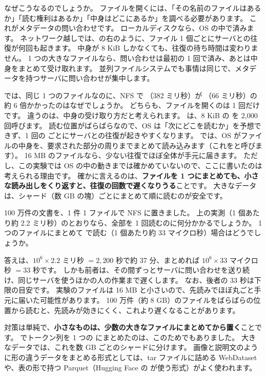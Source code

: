 なぜこうなるのでしょうか。
ファイルを開くには、「その名前のファイルはあるか」「読む権利はあるか」「中身はどこにあるか」を調べる必要があります。
これがメタデータの問い合わせです。
ローカルディスクなら、OS の中で済みます。
ネットワーク越しでは、の右のように、ファイル 1 個ごとにサーバとの往復が何回も起きます。
中身が 8 KiB しかなくても、往復の待ち時間は変わりません。
1 つの大きなファイルなら、問い合わせは最初の 1 回で済み、あとは中身をまとめて受け取れます。
並列ファイルシステムでも事情は同じで、メタデータを持つサーバに問い合わせが集中します。

では、同じ 1 つのファイルなのに、NFS で （382 ミリ秒）が （66 ミリ秒）の約 6 倍かかったのはなぜでしょうか。
どちらも、ファイルを開くのは 1 回だけです。
違うのは、中身の受け取り方だと考えられます。
 は、8 KiB の  を 2,000 回呼びます。
読む位置がばらばらなので、OS は「次にどこを読むか」を予想できず、1 回の  ごとにサーバとの往復が起きやすくなります。
 では、OS がファイルの中身を、要求された部分の周りまでまとめて読み込みます（これをと呼びます）。
16 MB のファイルなら、少ない往復でほぼ全体が手元に届きます。
ただし、この実験では OS の中の動きまでは確かめていないので、ここに書いたのは考えられる理由です。
確かに言えるのは、\textbf{ファイルを 1 つにまとめても、小さな読み出しをくり返すと、往復の回数で遅くなりうる}ことです。
大きなデータは、シャード（数 GB の塊）ごとにまとめて順に読むのが安全です。

\begin{quiz}
100 万件の文書を、1 件 1 ファイルで NFS に置きました。
上の実測（1 個あたり約 2.2 ミリ秒）のとおりなら、全部を 1 回読むのに何分かかるでしょうか。
1 つのファイルにまとめて  で読む（1 個あたり約 33 マイクロ秒）場合はどうでしょうか。
\end{quiz}

答えは、$10^{6}\times2.2$ ミリ秒 $=2{,}200$ 秒で約 37 分、まとめれば $10^{6}\times33$ マイクロ秒 $=33$ 秒です。
しかも前者は、その間ずっとサーバに問い合わせを送り続け、同じサーバを使うほかの人の作業まで遅くします。
なお、後者の 33 秒は下限の目安です。
実験のファイルは 16 MB と小さいので、先読みでほぼ丸ごと手元に届いた可能性があります。
100 万件（約 8 GB）のファイルをばらばらの位置から読むと、先読みが効きにくく、これより遅くなることがあります。

対策は単純で、\textbf{小さなものは、少数の大きなファイルにまとめてから置く}ことです。
でトークン列を 1 つの  にまとめたのは、このためでもありました。
大きなデータでは、これを数 GB ごとのシャードに分けます。
画像と説明文のように形の違うデータをまとめる形式としては、tar ファイルに詰める WebDataset や、表の形で持つ Parquet（Hugging Face の  が使う形式）がよく使われます。


